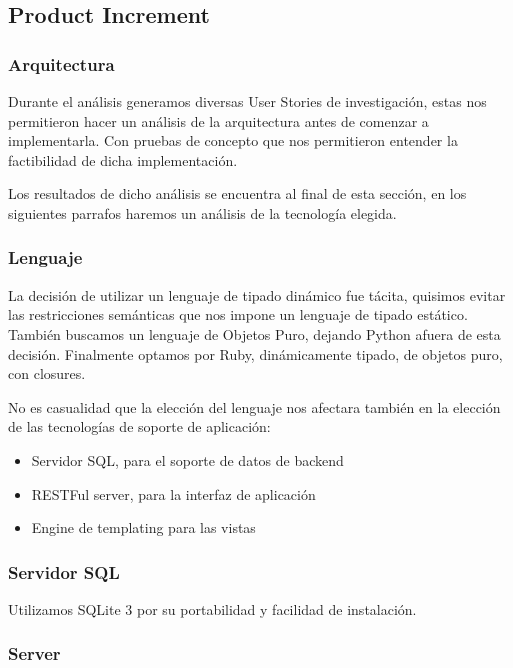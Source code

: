 \subsection{Product Increment}
\subsubsection{Arquitectura} %
\label{sub:Arquitectura}

Durante el an\'alisis generamos diversas User Stories de investigaci\'on, estas nos permitieron hacer un an\'alisis de la arquitectura antes de comenzar a implementarla.
Con pruebas de concepto que nos permitieron entender la factibilidad de dicha implementaci\'on.

Los resultados de dicho an\'alisis se encuentra al final de esta secci\'on, en los siguientes parrafos haremos un an\'alisis de la tecnolog\'ia elegida.

\subsubsection{Lenguaje}
La decisi\'on de utilizar un lenguaje de tipado din\'amico fue t\'acita, quisimos evitar las restricciones sem\'anticas que nos impone un lenguaje de tipado est\'atico.  
Tambi\'en buscamos un lenguaje de Objetos Puro, dejando Python afuera de esta decisi\'on.  
Finalmente optamos por Ruby, din\'amicamente tipado, de objetos puro, con closures.


No es casualidad que la elecci\'on del lenguaje nos afectara tambi\'en en la elecci\'on de las tecnolog\'ias de soporte de aplicaci\'on:
\begin{itemize}
    \item Servidor SQL, para el soporte de datos de backend
    \item RESTFul server, para la interfaz de aplicaci\'on
    \item Engine de templating para las vistas
\end{itemize}

\subsubsection{Servidor SQL}
Utilizamos SQLite 3 por su portabilidad y facilidad de instalaci\'on.

\subsubsection{Server}

